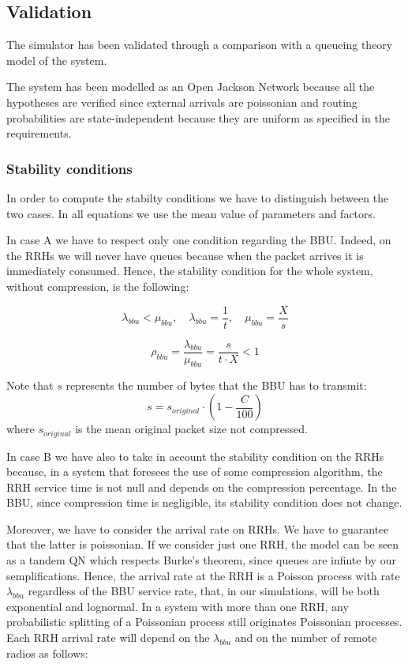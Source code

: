 \documentclass[11pt,a4paper,oneside, openright]{article}
\begin{document}
\subsection{Validation}
The simulator has been validated through a comparison with a queueing theory model of the system.

The system has been modelled as an Open Jackson Network because all the hypotheses are verified since external arrivals are poissonian and routing probabilities are state-independent because they are uniform as specified in the requirements.

\subsubsection{Stability conditions}
In order to compute the stabilty conditions we have to distinguish between the two cases. In all equations we use the mean value of parameters and factors.

In case A we have to respect only one condition regarding the BBU. Indeed, on the RRHs we will never have queues because when the packet arrives it is immediately consumed.
Hence, the stability condition for the whole system, without compression, is the following:

$$ \lambda_{bbu} < \mu_{bbu}, \quad \lambda_{bbu} = \frac{1}{t}, \quad \mu_{bbu} = \frac{X}{s}$$

\begin{equation} \label{eq:rho-bbu}
\rho_{bbu} = \frac{\lambda_{bbu}}{\mu_{bbu}} = \frac{s}{t \cdot X} < 1
\end{equation}

Note that $s$ represents the number of bytes that the BBU has to transmit:
$$s = s_{original}\cdot(1-\frac{C}{100})$$
where $ s_{original} $ is the mean original packet size not compressed.

In case B we have also to take in account the stability condition on the RRHs because, in a system that foresees the use of some compression algorithm, the RRH service time is not null and depends on the compression percentage. In the BBU, since compression time is negligible, its stability condition does not change. 

Moreover, we have to consider the arrival rate on RRHs.
We have to guarantee that the latter is poissonian. If we consider just one RRH, the model can be seen as a tandem QN which respects Burke's theorem, since queues are infinte by our semplifications. Hence, the arrival rate at the RRH is a Poisson process with rate $ \lambda_{bbu} $ regardless of the BBU service rate, that, in our simulations, will be both exponential and lognormal. 
In a system with more than one RRH, any probabilistic splitting of a Poissonian process still originates Poissonian processes. Each RRH arrival rate will depend on the $ \lambda_{bbu} $ and on the number of remote radios as follows:
\end{document}
